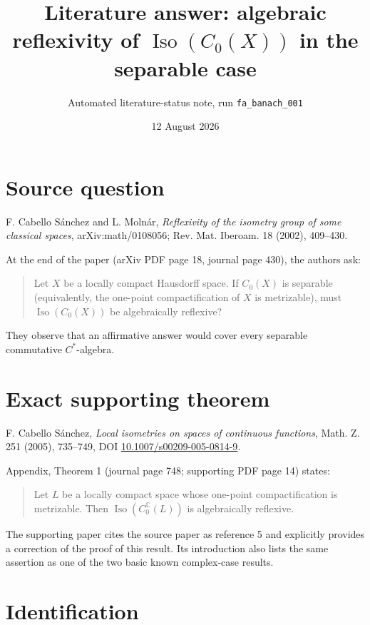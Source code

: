 \documentclass[10pt]{article}
\title{Literature answer: algebraic reflexivity of
$\operatorname{Iso}(C_0(X))$ in the separable case}
\author{Automated literature-status note, run \texttt{fa\_banach\_001}}
\date{12 August 2026}
\begin{document}
\maketitle

\begin{center}
\end{center}

\section*{Source question}

F. Cabello S\'anchez and L. Moln\'ar,
\emph{Reflexivity of the isometry group of some classical spaces},
arXiv:math/0108056; Rev. Mat. Iberoam. 18 (2002), 409--430.

At the end of the paper (arXiv PDF page 18, journal page 430), the authors
ask:
\begin{quote}
Let $X$ be a locally compact Hausdorff space.  If $C_0(X)$ is separable
(equivalently, the one-point compactification of $X$ is metrizable), must
$\operatorname{Iso}(C_0(X))$ be algebraically reflexive?
\end{quote}
They observe that an affirmative answer would cover every separable
commutative $C^*$-algebra.

\section*{Exact supporting theorem}

F. Cabello S\'anchez,
\emph{Local isometries on spaces of continuous functions},
Math. Z. 251 (2005), 735--749, DOI
\href{https://doi.org/10.1007/s00209-005-0814-9}
{10.1007/s00209-005-0814-9}.

Appendix, Theorem 1 (journal page 748; supporting PDF page 14) states:
\begin{quote}
Let $L$ be a locally compact space whose one-point compactification is
metrizable.  Then $\operatorname{Iso}(C_0^{\mathbb C}(L))$ is
algebraically reflexive.
\end{quote}
The supporting paper cites the source paper as reference 5 and explicitly
provides a correction of the proof of this result.  Its introduction also
lists the same assertion as one of the two basic known complex-case results.

\section*{Identification}
\end{document}
